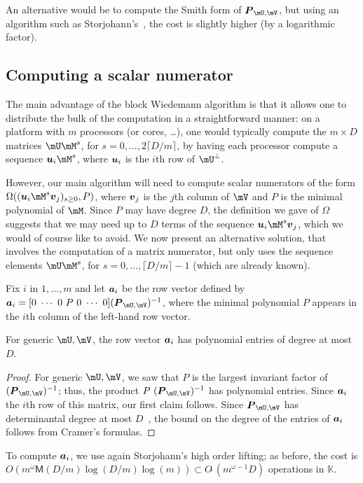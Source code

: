 \documentclass[12pt]{article}
\newcommand{\mat}[1]{\bm{\MakeUppercase{#1}}} %
\newcommand{\row}[1]{\bm{\MakeLowercase{#1}}} %
\newcommand{\col}[1]{\bm{\MakeLowercase{#1}}} %
\newcommand{\softO}[1]{O{\tilde{~}}(#1)} %
\newcommand{\minpoly}{P}
\def\M {\ensuremath{\mathsf{M}}}
\def\K{\mathbb{K}}
\def\K {\ensuremath{\mathbb{K}}}
\begin{document}
An alternative would be to compute the Smith form of
$\mat{P}_{\mU,\mV}$, but using an algorithm such as
Storjohann's~\cite{Stor03}, the cost is slightly higher (by a
logarithmic factor).


\subsection{Computing a scalar numerator}

The main advantage of the block Wiedemann algorithm is that it allows
one to distribute the bulk of the computation in a straightforward
manner: on a platform with $m$ processors (or cores, \dots), one would
typically compute the $m \times D$ matrices $\mU \mM^s$, for
$s=0,\dots,2\lceil D/m \rceil$, by having each processor compute a
sequence $\row{u}_i \mM^s$, where $\row{u}_i$ is the $i$th row of
$\mU^\perp$. 

However, our main algorithm will need to compute scalar numerators of
the form \sloppy $\Omega((\row{u}_i \mM^s \col{v}_j)_{s \ge 0},
\minpoly)$, where $\col{v}_j$ is the $j$th column of $\mV$ and
$\minpoly$ is the minimal polynomial of $\mM$. Since $\minpoly$ may
have degree $D$, the definition we gave of $\Omega$ suggests that we
may need up to $D$ terms of the sequence $\row{u}_i \mM^s \col{v}_j$,
which we would of course like to avoid. We now present an alternative
solution, that involves the computation of a matrix numerator, but
only uses the sequence elements $\mU \mM^s$, for $s=0,\dots,\lceil D/m
\rceil-1$ (which are already known).

Fix $i$ in $1,\dots,m$ and let $\row{a}_i$ be the row vector defined
by $\row{a}_i = [0~\cdots~0~\minpoly~0~\cdots~0] (\mat{P}_{\mU,\mV})^{-1}$,
where the minimal polynomial $\minpoly$ appears in the $i$th column of the
left-hand row vector. 
\begin{lemma}\label{utilde}
  For generic $\mU,\mV$, the row vector $\row{a}_i$ has polynomial
  entries of degree at most~$D$.
\end{lemma}
\begin{proof}
  For generic $\mU,\mV$, we saw that $\minpoly$ is the largest
  invariant factor of $ (\mat{P}_{\mU,\mV})^{-1}$; thus, the product
  $\minpoly\ (\mat{P}_{\mU,\mV})^{-1}$ has polynomial entries. Since $\row{a}_i$ 
  the $i$th row of this matrix, our first claim follows. Since
  $\mat{P}_{\mU,\mV}$ has determinantal degree at most $D$~\cite{xxx}, the bound
  on the degree of the entries of $\row{a}_i$ follows from Cramer's
  formulas.
\end{proof}
To compute $\row{a}_i$, we use again Storjohann's high order lifting;
as before, the cost is $O(m^{\omega} \M(D/m) \log(D/m) \log(m))
\subset \softO{m^{\omega-1}D}$ operations in $\K$.
\end{document}
